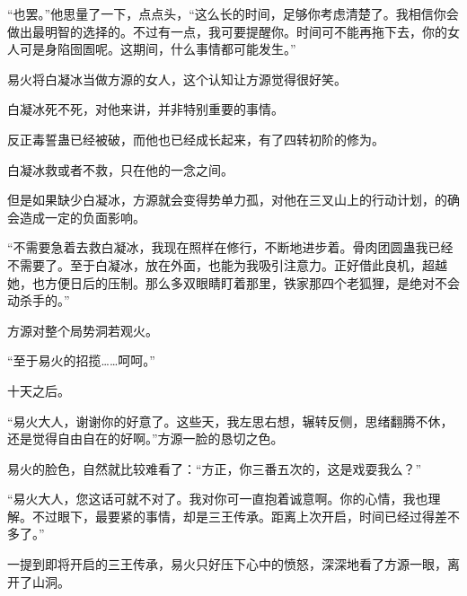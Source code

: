 \begin{this_body}
“也罢。”他思量了一下，点点头，“这么长的时间，足够你考虑清楚了。我相信你会做出最明智的选择的。不过有一点，我可要提醒你。时间可不能再拖下去，你的女人可是身陷囹圄呢。这期间，什么事情都可能发生。”

易火将白凝冰当做方源的女人，这个认知让方源觉得很好笑。

白凝冰死不死，对他来讲，并非特别重要的事情。

反正毒誓蛊已经被破，而他也已经成长起来，有了四转初阶的修为。

白凝冰救或者不救，只在他的一念之间。

但是如果缺少白凝冰，方源就会变得势单力孤，对他在三叉山上的行动计划，的确会造成一定的负面影响。

“不需要急着去救白凝冰，我现在照样在修行，不断地进步着。骨肉团圆蛊我已经不需要了。至于白凝冰，放在外面，也能为我吸引注意力。正好借此良机，超越她，也方便日后的压制。那么多双眼睛盯着那里，铁家那四个老狐狸，是绝对不会动杀手的。”

方源对整个局势洞若观火。

“至于易火的招揽……呵呵。”

十天之后。

“易火大人，谢谢你的好意了。这些天，我左思右想，辗转反侧，思绪翻腾不休，还是觉得自由自在的好啊。”方源一脸的恳切之色。

易火的脸色，自然就比较难看了：“方正，你三番五次的，这是戏耍我么？”

“易火大人，您这话可就不对了。我对你可一直抱着诚意啊。你的心情，我也理解。不过眼下，最要紧的事情，却是三王传承。距离上次开启，时间已经过得差不多了。”

一提到即将开启的三王传承，易火只好压下心中的愤怒，深深地看了方源一眼，离开了山洞。

\end{this_body}

